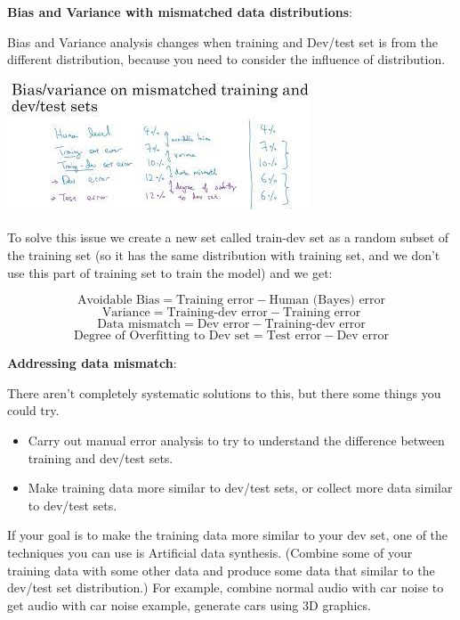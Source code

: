\documentclass{article}
\begin{document}
\noindent \textbf{Bias and Variance with mismatched data distributions}:

\noindent Bias and Variance analysis changes when training and Dev/test set is from the different distribution, because you need to consider the influence of distribution.

\begin{center}
\includegraphics[scale=0.8]{./images/bias_variance_mismatched_data.jpg}
\end{center}

\noindent To solve this issue we create a new set called train-dev set as a random subset of the training set (so it has the same distribution with training set, and we don't use this part of training set to train the model) and we get:

\[\text{Avoidable Bias} = \text{Training error} - \text{Human (Bayes) error}\]
\[\text{Variance} = \text{Training-dev error} - \text{Training error}\]
\[\text{Data mismatch} = \text{Dev error} - \text{Training-dev error}\]
\[\text{Degree of Overfitting to Dev set} = \text{Test error} - \text{Dev error}\]

\noindent \textbf{Addressing data mismatch}:

\noindent There aren't completely systematic solutions to this, but there some things you could try.

\begin{itemize}
    \item Carry out manual error analysis to try to understand the difference between training and dev/test sets.
    \item Make training data more similar to dev/test sets, or collect more data similar to dev/test sets.
\end{itemize}

\noindent If your goal is to make the training data more similar to your dev set, one of the techniques you can use is Artificial data synthesis. (Combine some of your training data with some other data and produce some data that similar to the dev/test set distribution.) For example, combine normal audio with car noise to get audio with car noise example, generate cars using 3D graphics.
\end{document}
